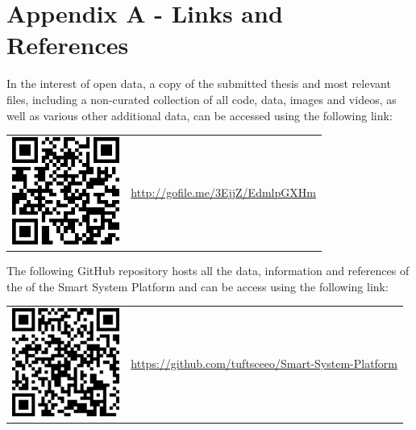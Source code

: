 \cleardoublepage%
\chapter*{\label{chap:apx_a}Appendix A - Links and References}
%

In the interest of open data, a copy of the submitted thesis and most relevant files, including a non-curated collection of all code, data, images and videos, as well as various other additional data, can be accessed using the following link:
\vspace{25pt}
\begin{center}
\begin{tabular}{>{\centering\arraybackslash} m{175pt} m{300pt}}
 \includegraphics[width=100pt]{images/Master Thesis-QRcode.png} & \url{http://gofile.me/3EjjZ/EdmlpGXHm}\\
\end{tabular}
\end{center}
\vspace{25pt}

The following GitHub repository hosts all the data, information and references of the of the Smart System Platform and can be access using the following link:
\vspace{25pt}
\begin{center}
\begin{tabular}{>{\centering\arraybackslash} m{175pt} m{300pt}}
 \includegraphics[width=100pt]{images/GitHub-QRcode.png} & 
 \url{https://github.com/tuftsceeo/Smart-System-Platform}\\
\end{tabular}
\end{center}
\vspace{25pt}

